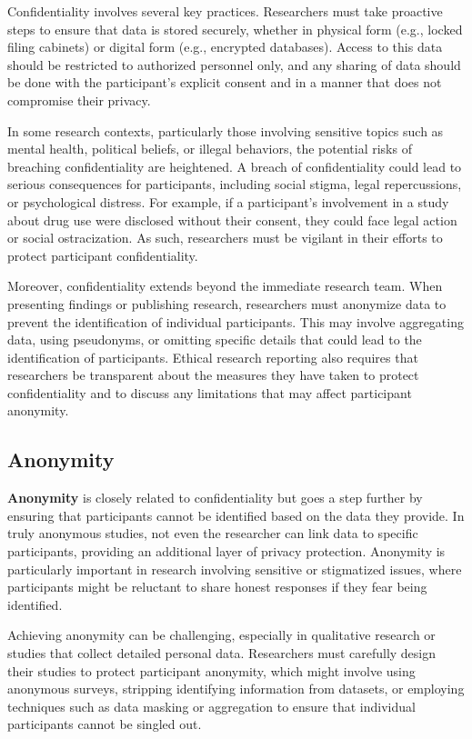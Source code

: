 \documentclass[
]{book}
\begin{document}
Confidentiality involves several key practices. Researchers must take proactive steps to ensure that data is stored securely, whether in physical form (e.g., locked filing cabinets) or digital form (e.g., encrypted databases). Access to this data should be restricted to authorized personnel only, and any sharing of data should be done with the participant's explicit consent and in a manner that does not compromise their privacy.

In some research contexts, particularly those involving sensitive topics such as mental health, political beliefs, or illegal behaviors, the potential risks of breaching confidentiality are heightened. A breach of confidentiality could lead to serious consequences for participants, including social stigma, legal repercussions, or psychological distress. For example, if a participant's involvement in a study about drug use were disclosed without their consent, they could face legal action or social ostracization. As such, researchers must be vigilant in their efforts to protect participant confidentiality.

Moreover, confidentiality extends beyond the immediate research team. When presenting findings or publishing research, researchers must anonymize data to prevent the identification of individual participants. This may involve aggregating data, using pseudonyms, or omitting specific details that could lead to the identification of participants. Ethical research reporting also requires that researchers be transparent about the measures they have taken to protect confidentiality and to discuss any limitations that may affect participant anonymity.

\subsection*{Anonymity}\label{anonymity}

\textbf{Anonymity} is closely related to confidentiality but goes a step further by ensuring that participants cannot be identified based on the data they provide. In truly anonymous studies, not even the researcher can link data to specific participants, providing an additional layer of privacy protection. Anonymity is particularly important in research involving sensitive or stigmatized issues, where participants might be reluctant to share honest responses if they fear being identified.

Achieving anonymity can be challenging, especially in qualitative research or studies that collect detailed personal data. Researchers must carefully design their studies to protect participant anonymity, which might involve using anonymous surveys, stripping identifying information from datasets, or employing techniques such as data masking or aggregation to ensure that individual participants cannot be singled out.
\end{document}

